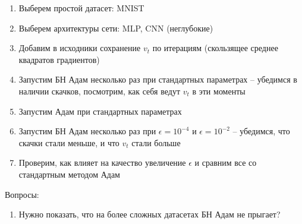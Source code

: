 \documentclass[12pt,oneside]{article}
\begin{document}
\begin{enumerate}
\item Выберем простой датасет: MNIST
\item Выберем архитектуры сети: MLP, CNN (неглубокие)
\item Добавим в исходники сохранение $v_t$ по итерациям (скользящее среднее квадратов градиентов)
\item Запустим БН Адам несколько раз при стандартных параметрах -- убедимся в наличии скачков, посмотрим, как себя ведут $v_t$ в эти моменты
\item Запустим Адам при стандартных параметрах
\item Запустим БН Адам несколько раз при $\epsilon = 10^{-4}$ и $\epsilon = 10^{-2}$ -- убедимся, что скачки стали меньше, и что $v_t$ стали больше
\item Проверим, как влияет на качество увеличение $\epsilon$ и сравним все со стандартным методом Адам
\end{enumerate}

Вопросы:

\begin{enumerate}
\item Нужно показать, что на более сложных датасетах БН Адам не прыгает?
\end{enumerate}
\end{document}
